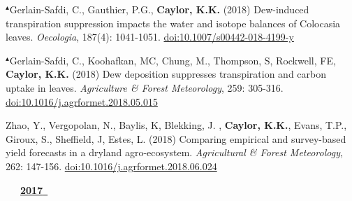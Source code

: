 \begin{etaremune}
\item $^{\blacktriangle}$Gerlain-Safdi, C., Gauthier, P.G., \textbf{ Caylor, K.K.} (2018) Dew-induced transpiration suppression impacts the water and isotope balances of Colocasia leaves. \emph{Oecologia}, 187(4): 1041-1051. \href{https://doi.org/10.1007/s00442-018-4199-y}{doi:10.1007/s00442-018-4199-y}
\item $^{\blacktriangle}$Gerlain-Safdi, C., Koohafkan, MC, Chung, M., Thompson, S, Rockwell, FE, \textbf{ Caylor, K.K.} (2018) Dew deposition suppresses transpiration and carbon uptake in leaves. \emph{Agriculture \& Forest Meteorology}, 259: 305-316. \href{https://doi.org/10.1016/j.agrformet.2018.05.015}{doi:10.1016/j.agrformet.2018.05.015}
\item Zhao, Y., Vergopolan, N., Baylis, K, Blekking, J. , \textbf{ Caylor, K.K.}, Evans, T.P., Giroux, S., Sheffield, J, Estes, L. (2018) Comparing empirical and survey-based yield forecasts in a dryland agro-ecosystem. \emph{Agricultural \& Forest Meteorology}, 262: 147-156. \href{https://doi.org/10.1016/j.agrformet.2018.06.024}{doi:10.1016/j.agrformet.2018.06.024}

\vspace{0.1in}
\mbox{\ \ \ \underline{\textbf{2017 }}}
\vspace{0.1in}


\end{etaremune}

